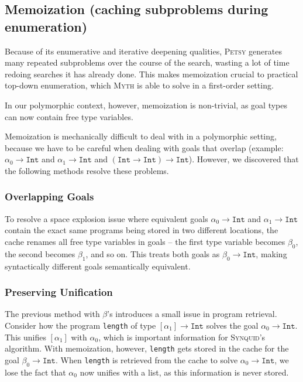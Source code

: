 \documentclass[acmsmall,nonacm]{acmart}
\begin{document}
\subsection{Memoization (caching subproblems during enumeration)}

Because of its enumerative and iterative deepening qualities, \textsc{Petsy} 
generates many repeated subproblems
over the course of the search, wasting a lot of time redoing searches it has
already done. This makes memoization crucial to practical 
top-down enumeration, which \textsc{Myth} \cite{myth} is able to solve in a 
first-order setting.

In our polymorphic context, however, memoization is non-trivial, as goal types
can now contain free type variables. 

Memoization is mechanically difficult to deal with in a polymorphic setting,
because we have to be careful when dealing with goals that overlap (example:
$\alpha_0 \to \texttt{Int}$ and $\alpha_1 \to \texttt{Int}$ and
$(\texttt{Int} \to \texttt{Int}) \to \texttt{Int}$).
However, we discovered that the following methods resolve these problems.


\subsubsection{Overlapping Goals}

To resolve a space explosion issue where equivalent goals
$\alpha_0 \to \texttt{Int}$ and $\alpha_1 \to \texttt{Int}$
contain the exact same programs being stored in two different locations,
the cache renames all free type variables in goals --
the first type variable becomes $\beta_0$,
the second becomes $\beta_1$, and so on.
This treats both goals as $\beta_0 \to \texttt{Int}$,
making syntactically different goals semantically equivalent.
  
\subsubsection{Preserving Unification}
The previous method with $\beta$'s introduces a small issue in program retrieval.
Consider how
the program \texttt{length} of type $[\alpha_1] \to \texttt{Int}$
solves the goal $\alpha_0 \to \texttt{Int}$.
This unifies $[\alpha_1]$ with $\alpha_0$, which is important information for
\textsc{Synquid}'s algorithm.
With memoization, however, \texttt{length} gets stored in the cache for the goal
$\beta_0 \to \texttt{Int}$.
When \texttt{length} is retrieved from the cache to solve $\alpha_0 \to \texttt{Int}$,
we lose the fact that $\alpha_0$ now unifies with a list,
as this information is never stored.
\end{document}
